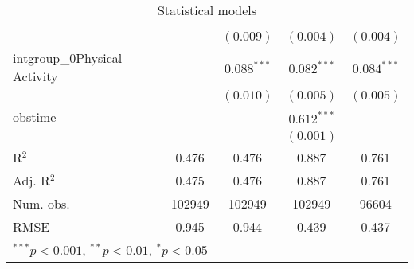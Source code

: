 \begin{table}
{\begin{tabular}{l c c c c }
                             &                & $(0.009)$      & $(0.004)$      & $(0.004)$      \\
intgroup\_0Physical Activity &                & $0.088^{***}$  & $0.082^{***}$  & $0.084^{***}$  \\
                             &                & $(0.010)$      & $(0.005)$      & $(0.005)$      \\
obstime                      &                &                & $0.612^{***}$  &                \\
                             &                &                & $(0.001)$      &                \\
\hline
R$^2$                        & 0.476          & 0.476          & 0.887          & 0.761          \\
Adj. R$^2$                   & 0.475          & 0.476          & 0.887          & 0.761          \\
Num. obs.                    & 102949         & 102949         & 102949         & 96604          \\
RMSE                         & 0.945          & 0.944          & 0.439          & 0.437          \\
\hline
\multicolumn{5}{l}{\scriptsize{$^{***}p<0.001$, $^{**}p<0.01$, $^*p<0.05$}}
\end{tabular}%
}
\caption{Statistical models}
\label{tab:fit_qaly}
\end{table}
